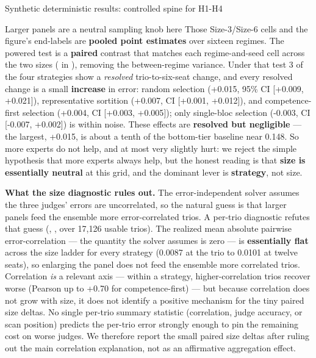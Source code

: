 \documentclass[
  ignorenonframetext,
]{beamer}
\begin{document}
\begin{frame}{Synthetic deterministic results:
controlled spine for H1-H4}
\begin{block}{Larger panels are a neutral sampling knob here}
Those Size-3/Size-6 cells and the figure's end-labels are \textbf{pooled
point estimates} over sixteen regimes. The powered test is a
\textbf{paired} contrast that matches each regime-and-seed cell across
the two sizes ( in
), removing the
between-regime variance. Under that test 3 of the four strategies show a
\emph{resolved} trio-to-six-seat change, and every resolved change is a
small \textbf{increase} in error: random selection (+0.015, 95\% CI
{[}+0.009, +0.021{]}), representative sortition (+0.007, CI {[}+0.001,
+0.012{]}), and competence-first selection (+0.004, CI {[}+0.003,
+0.005{]}); only single-bloc selection (-0.003, CI {[}-0.007, +0.002{]})
is within noise. These effects are \textbf{resolved but negligible} ---
the largest, +0.015, is about a tenth of the bottom-tier baseline near
0.148. So more experts do not help, and at most very slightly hurt: we
reject the simple hypothesis that more experts always help, but the
honest reading is that \textbf{size is essentially neutral} at this
grid, and the dominant lever is \textbf{strategy}, not size.

\textbf{What the size diagnostic rules out.} The error-independent
solver assumes the three judges' errors are uncorrelated, so the natural
guess is that larger panels feed the ensemble more error-correlated
trios. A per-trio diagnostic refutes that guess (,
, over 17,126 usable
trios). The realized mean absolute pairwise error-correlation --- the
quantity the solver assumes is zero --- is \textbf{essentially flat}
across the size ladder for every strategy (0.0087 at the trio to 0.0101
at twelve seats), so enlarging the panel does not feed the ensemble more
correlated trios. Correlation \emph{is} a relevant axis --- within a
strategy, higher-correlation trios recover worse (Pearson up to +0.70
for competence-first) --- but because correlation does not grow with
size, it does not identify a positive mechanism for the tiny paired size
deltas. No single per-trio summary statistic (correlation, judge
accuracy, or scan position) predicts the per-trio error strongly enough
to pin the remaining cost on worse judges. We therefore report the small
paired size deltas after ruling out the main correlation explanation,
not as an affirmative aggregation effect.


\end{block}
\end{frame}
\end{document}
